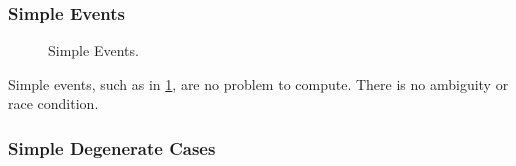 \documentclass[12pt,a4paper,oneside,openany]{article}
\begin{document}
\subsubsection{Simple Events}

\begin{figure}[htpb]
\begin{center}
\caption{Simple Events.}
\label{fig:simpleevents}
\end{center}
\end{figure}

Simple events, such as in \cref{fig:simpleevents}, are no problem to compute. There is no ambiguity or race condition.


\subsubsection{Simple Degenerate Cases}
\end{document}
